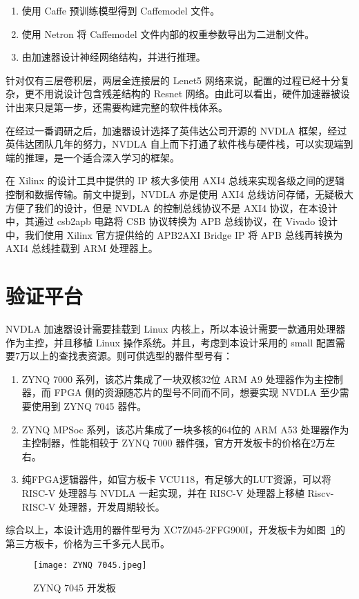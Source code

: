 \begin{enumerate}
    \item 使用 Caffe 预训练模型得到 Caffemodel 文件。
    \item 使用 Netron 将 Caffemodel 文件内部的权重参数导出为二进制文件。
    \item 由加速器设计神经网络结构，并进行推理。
\end{enumerate}

针对仅有三层卷积层，两层全连接层的 Lenet5 网络来说，配置的过程已经十分复杂，更不用说设计包含残差结构的 Resnet 网络。由此可以看出，硬件加速器被设计出来只是第一步，还需要构建完整的软件栈体系。

在经过一番调研之后，加速器设计选择了英伟达公司开源的 NVDLA 框架，经过英伟达团队几年的努力，NVDLA 自上而下打通了软件栈与硬件栈，可以实现端到端的推理，是一个适合深入学习的框架。

在 Xilinx 的设计工具中提供的 IP 核大多使用 AXI4 总线来实现各级之间的逻辑控制和数据传输。前文中提到，NVDLA 亦是使用 AXI4 总线访问存储，无疑极大方便了我们的设计，但是 NVDLA 的控制总线协议不是 AXI4 协议，在本设计中，其通过 csb2apb 电路将 CSB 协议转换为 APB 总线协议，在 Vivado 设计中，我们使用 Xilinx 官方提供给的 APB2AXI Bridge IP 将 APB 总线再转换为 AXI4 总线挂载到 ARM 处理器上。

\section{验证平台}

NVDLA 加速器设计需要挂载到 Linux 内核上，所以本设计需要一款通用处理器作为主控，并且移植 Linux 操作系统。并且，考虑到本设计采用的 small 配置需要7万以上的查找表资源。则可供选型的器件型号有：

\begin{enumerate}
    \item ZYNQ 7000 系列，该芯片集成了一块双核32位 ARM A9 处理器作为主控制器，而 FPGA 侧的资源随芯片的型号不同而不同，想要实现 NVDLA 至少需要使用到 ZYNQ 7045 器件。
    \item ZYNQ MPSoc 系列，该芯片集成了一块多核的64位的 ARM A53 处理器作为主控制器，性能相较于 ZYNQ 7000 器件强，官方开发板卡的价格在2万左右。
    \item 纯FPGA逻辑器件，如官方板卡 VCU118，有足够大的LUT资源，可以将 RISC-V 处理器与 NVDLA 一起实现，并在 RISC-V 处理器上移植 Riscv-   RISC-V 处理器，开发周期较长。
\end{enumerate}

综合以上，本设计选用的器件型号为 XC7Z045-2FFG900I，开发板卡为如图~\ref{fig:ZYNQ 7045}的第三方板卡，价格为三千多元人民币。

\begin{figure}[!htbp]
    \centering
    \texttt{[image: ZYNQ 7045.jpeg]}
    \caption{ZYNQ 7045 开发板}
    \label{fig:ZYNQ 7045}
\end{figure}


